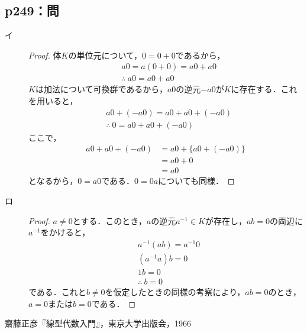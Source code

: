 \documentclass[uplatex,dvipdfmx,a4paper,10pt,fleqn]{jsarticle}
\begin{document}
\subsection*{p249：問}

\begin{tleftbar}
\begin{description}
    \item[イ] 
	\begin{proof}
		体$K$の単位元について，$0=0+0$であるから，
		\begin{align*}
			&a 0=a(0+0)=a0 + a0\\
			&\therefore ~ a0 = a0 + a0
		\end{align*}
		$K$は加法について可換群であるから，$a0$の逆元$-a0$が$K$に存在する．これを用いると，
\begin{align*}
	&a0 + (-a0) = a0 + a0 + (-a0) \\
	&\therefore ~ 0 = a0 + a0 +(-a0)
\end{align*}
 ここで，
 \begin{align*}
	a0 + a0 +(-a0)&=a0+ \{a0+(-a0)\} \\
	& = a0 + 0 \\
	& = a0
 \end{align*}
となるから，$0=a0$である．$0=0a$についても同様．
\end{proof}
\item[ロ]
\begin{proof}
        $a \ne 0$とする．このとき，$a$の逆元$a^{-1} \in K$が存在し，$ab=0$の両辺に$a^{-1}$をかけると，
        \begin{align*}
            &a^{-1} (ab) = a^{-1} 0 \\
            &(a^{-1}a)b =0 \\
            &1b =0 \\
            &\therefore~ b=0
        \end{align*}
        である．これと$b \ne 0$を仮定したときの同様の考察により，$ab=0$のとき，$a=0$または$b=0$である．
    \end{proof}
    \end{description}
\end{tleftbar}

\begin{thebibliography}{9}
	 齋藤正彦『線型代数入門』，東京大学出版会，1966
\end{thebibliography}
\end{document}
